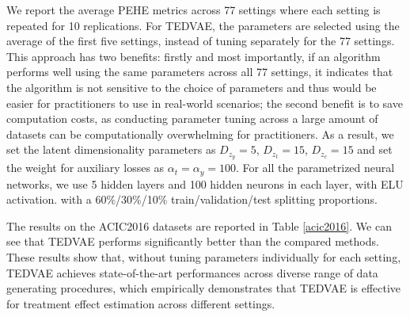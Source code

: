 \documentclass[letterpaper]{article} %
\begin{document}
We report the average PEHE metrics across 77 settings where each setting is repeated for 10 replications. For TEDVAE, the parameters are selected using the average of the first five settings, instead of tuning separately for the 77 settings. This approach has two benefits: firstly and most importantly, if an algorithm performs well using the same parameters across all 77 settings, it indicates that the algorithm is not sensitive to the choice of parameters and thus would be easier for practitioners to use in real-world scenarios; the second benefit is to save computation costs, as conducting parameter tuning across a large amount of datasets can be computationally overwhelming for practitioners.
As a result, we set the latent dimensionality parameters as $D_{z_y}=5$, $D_{z_t}=15$, $D_{z_c}=15$ and set the weight for auxiliary losses as $\alpha_t=\alpha_y=100$. For all the parametrized neural networks, we use 5 hidden layers and 100 hidden neurons in each layer, with ELU activation.   with a 60\%/30\%/10\% train/validation/test splitting proportions.

The results on the ACIC2016 datasets are reported in Table \ref{acic2016}. We can see that TEDVAE performs significantly better than the compared methods.
These results show that, without tuning parameters individually for each setting, TEDVAE achieves state-of-the-art performances across diverse range of data generating procedures, which empirically demonstrates that TEDVAE is effective for treatment effect estimation across different settings.
\end{document}
